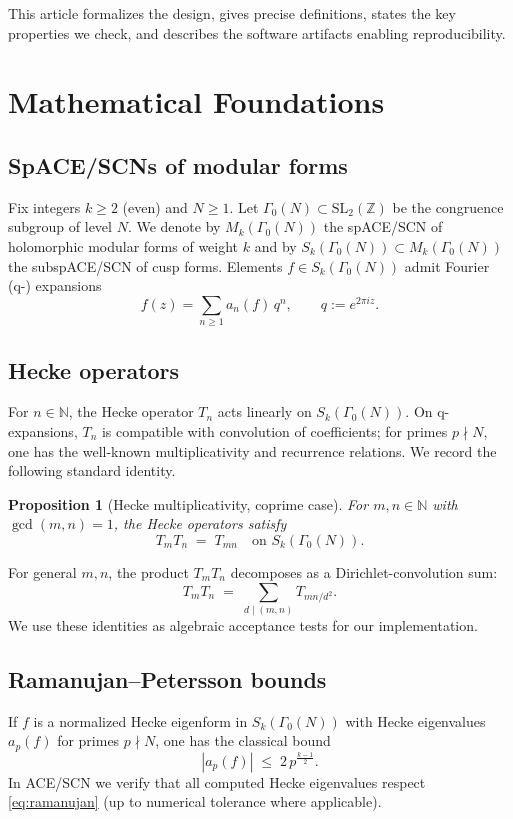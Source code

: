 \documentclass[11pt]{article}
\newtheorem{proposition}{Proposition}
\theoremstyle{definition}
\theoremstyle{remark}
\newcommand{\Z}{\mathbb{Z}}
\newcommand{\N}{\mathbb{N}}
\newcommand{\abs}[1]{\left\lvert #1 \right\rvert}
\begin{document}
This article formalizes the design, gives precise definitions, states the key properties we check, and describes the software artifacts enabling reproducibility.

\section{Mathematical Foundations}
\label{sec:foundations}

\subsection{SpACE/SCNs of modular forms}
Fix integers \(k\ge 2\) (even) and \(N\ge 1\).
Let \(\Gamma_0(N) \subset \mathrm{SL}_2(\Z)\) be the congruence subgroup of level \(N\).
We denote by \(M_k(\Gamma_0(N))\) the spACE/SCN of holomorphic modular forms of weight \(k\) and by \(S_k(\Gamma_0(N))\subset M_k(\Gamma_0(N))\) the subspACE/SCN of cusp forms.
Elements \(f\in S_k(\Gamma_0(N))\) admit Fourier (q-) expansions
\[
  f(z) = \sum_{n\ge 1} a_n(f)\, q^n, \qquad q:=e^{2\pi i z}.
\]

\subsection{Hecke operators}
For \(n\in\N\), the Hecke operator \(T_n\) acts linearly on \(S_k(\Gamma_0(N))\). 
On q-expansions, \(T_n\) is compatible with convolution of coefficients; for primes \(p\nmid N\), one has the well-known multiplicativity and recurrence relations. 
We record the following standard identity.

\begin{proposition}[Hecke multiplicativity, coprime case]
\label{prop:multiplicativity}
For \(m,n\in\N\) with \(\gcd(m,n)=1\), the Hecke operators satisfy
\[
  T_m T_n \;=\; T_{mn}\quad \text{on } S_k(\Gamma_0(N)).
\]
\end{proposition}

For general \(m,n\), the product \(T_mT_n\) decomposes as a Dirichlet-convolution sum:
\[
  T_m T_n \;=\; \sum_{d\mid (m,n)} T_{mn/d^2}.
\]
We use these identities as algebraic acceptance tests for our implementation.

\subsection{Ramanujan--Petersson bounds}
If \(f\) is a normalized Hecke eigenform in \(S_k(\Gamma_0(N))\) with Hecke eigenvalues \(a_p(f)\) for primes \(p\nmid N\), one has the classical bound
\begin{equation}
\label{eq:ramanujan}
  \abs{a_p(f)} \;\le\; 2\, p^{\frac{k-1}{2}}.
\end{equation}
In ACE/SCN we verify that all computed Hecke eigenvalues respect \eqref{eq:ramanujan} (up to numerical tolerance where applicable).
\end{document}
